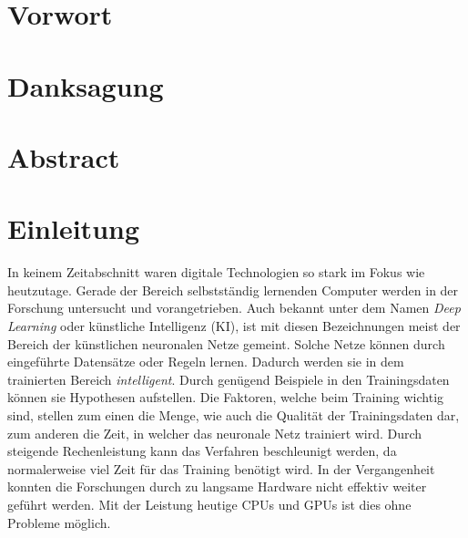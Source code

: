 \documentclass[a4paper,12pt,oneside]{article}
\begin{document}
  \newpage
  \section*{Vorwort}
  \section*{Danksagung}
  \section*{Abstract}
  \newpage
  \listoffigures
  \newpage
  \listoftables
  \newpage
  \tableofcontents
  \newpage
  \section{Einleitung}\label{s.einleitung} 
In keinem Zeitabschnitt waren digitale Technologien so stark im Fokus wie heutzutage. Gerade der Bereich selbstständig lernenden Computer werden in der Forschung untersucht und vorangetrieben. Auch bekannt unter dem Namen \textit{Deep Learning} oder künstliche Intelligenz (KI), ist mit diesen Bezeichnungen meist der Bereich der künstlichen neuronalen Netze gemeint. Solche Netze können durch eingeführte Datensätze oder Regeln lernen. Dadurch werden sie in dem trainierten Bereich \textit{intelligent}. Durch genügend Beispiele in den Trainingsdaten können sie Hypothesen aufstellen. Die Faktoren, welche beim Training wichtig sind, stellen zum einen die Menge, wie auch die Qualität der Trainingsdaten dar, zum anderen die Zeit, in welcher das neuronale Netz trainiert wird. Durch steigende Rechenleistung kann das Verfahren beschleunigt werden, da normalerweise viel Zeit für das Training benötigt wird. In der Vergangenheit konnten die Forschungen durch zu langsame Hardware nicht effektiv weiter geführt werden. Mit der Leistung heutige CPUs und GPUs ist dies ohne Probleme möglich.\\ 
\end{document}
